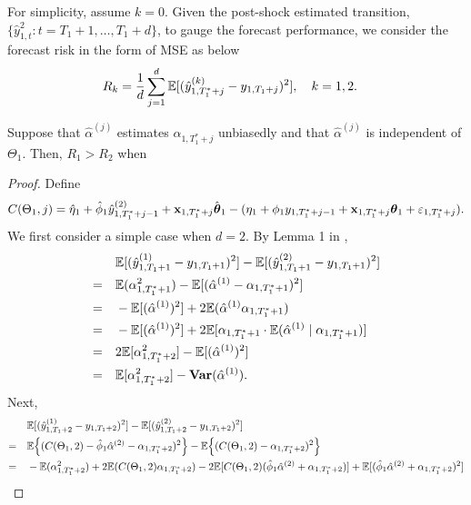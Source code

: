 \documentclass[12pt]{article}
\begin{document}
For simplicity, assume $k=0$. Given the post-shock estimated transition, $\{\hat{y}_{1, t}^2\colon t= T_1 +1, \ldots, T_1+d\}$, to gauge the forecast performance, we consider the forecast risk in the form of MSE as below
\begin{align*}
  R_k 
  &= \frac{1}{d} \sum_{j=1}^d \mathbb{E} [(\hat{y}_{1,T_1^*+j}^{(k)}-y_{1, T_1+j})^2] ,
  \quad k = 1, 2.
\end{align*}

\begin{proposition}
  Suppose that $\hat{\alpha}^{(j)}$ estimates $\alpha_{1, T_1^*+j}$ unbiasedly and that  $\hat{\alpha}^{(j)}$ is independent of $\Theta_1$. Then, $R_1 > R_2$ when
\end{proposition}
\begin{proof}
  Define
\begin{align*}
  C(\Theta_1, j) = \hat{\eta}_1 + \hat{\phi}_1 \hat{y}_{1, T_1^*+j-1}^{(2)} + \mathbf{x}_{1, T_1^*+j}\hat{\boldsymbol{\theta}}_1 - (\eta_1 + \phi_1 y_{1, T_1^* + j-1} + \mathbf{x}_{1, T_1^*+j} \boldsymbol{\theta}_1 +\varepsilon_{1, T_1^*+j}) .
\end{align*}
We first consider a simple case when $d=2$. By Lemma 1 in \cite{lin2020minimizing},
\begin{align*}
  & \mathbb{E} [(\hat{y}_{1,T_1+1}^{(1)}-y_{1, T_1+1})^2] -  \mathbb{E} [(\hat{y}_{1,T_1+1}^{(2)}-y_{1, T_1+1})^2]\\
= \quad   & \mathbb{E}(\alpha_{1, T_1^*+1}^2) - \mathbb{E}[(\hat{\alpha}^{(1)}-\alpha_{1, T_1^*+1})^2] \\
= \quad & - \mathbb{E}[ (\hat{\alpha}^{(1)})^2]+2 \mathbb{E}(\hat{\alpha}^{(1)} \alpha_{1, T_1^*+1}) \\
= \quad &  - \mathbb{E}[ (\hat{\alpha}^{(1)})^2]+2 \mathbb{E}[\alpha_{1, T_1^*+1} \cdot \mathbb{E}(\hat{\alpha}^{(1)} \mid  \alpha_{1, T_1^*+1})] \\
= \quad & 2 \mathbb{E}[ \alpha_{1, T_1^*+2}^2]- \mathbb{E}[(\hat{\alpha}^{(1)})^2] \\
= \quad & \mathbb{E}[ \alpha_{1, T_1^*+2}^2]- \mathbf{Var}(\hat{\alpha}^{(1)}).
\end{align*}
Next,
\begin{align*}
 & \E [(\hat{y}_{1,T_1+2}^{(1)}-y_{1, T_1+2})^2] -  \E [(\hat{y}_{1,T_1+2}^{(2)}-y_{1, T_1+2})^2]  \\
= \quad  & \E \Big\{ (C(\Theta_1, 2) - \hat{\phi}_1\hat{\alpha}^{(2)}-\alpha_{1, T_1^*+2})^2\Big\}- \E \Big\{ (C(\Theta_1, 2) -\alpha_{1, T_1^*+2})^2\Big\} \\
= \quad & -\E (\alpha_{1, T_1^*+2}^2)  + 2 \E (C(\Theta_1, 2)\alpha_{1, T_1^*+2}) - 2 \E [C(\Theta_1, 2) (\hat{\phi}_1\hat{\alpha}^{(2)}+\alpha_{1, T_1^*+2})] + \E[(\hat{\phi}_1\hat{\alpha}^{(2)}+\alpha_{1, T_1^*+2})^2] \\

\end{align*}
\end{proof}
\end{document}
